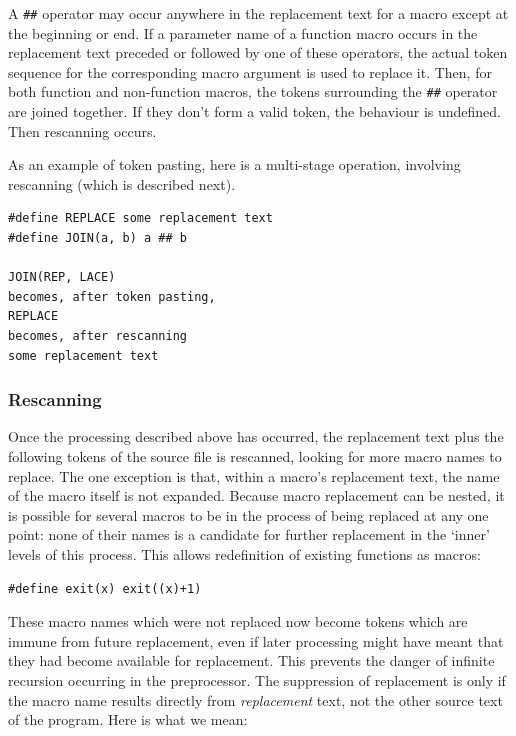     A \texttt{\#\#} operator may occur anywhere in the replacement text
     for a macro except at the beginning or end. If a parameter name of
     a function macro occurs in the replacement text preceded or followed by
     one of these operators, the actual token sequence for the corresponding
     macro argument is used to replace it. Then, for both function and
     non-function macros, the tokens surrounding the \texttt{\#\#}
     operator are joined together. If they don't form a valid token, the
     behaviour is undefined. Then rescanning occurs.


    As an example of token pasting, here is a multi-stage operation,
     involving rescanning (which is described next).


    \begin{Verbatim}
#define REPLACE some replacement text
#define JOIN(a, b) a ## b

JOIN(REP, LACE)
becomes, after token pasting,
REPLACE
becomes, after rescanning
some replacement text
\end{Verbatim}

   

   \subsubsection{Rescanning}
    

    Once the processing described above has occurred, the replacement
     text plus the following tokens of the source file is rescanned, looking
     for more macro names to replace. The one exception is that, within
     a macro's replacement text, the name of the macro itself is not
     expanded. Because macro replacement can be nested, it is possible for
     several macros to be in the process of being replaced at any one point:
     none of their names is a candidate for further replacement in the
     `inner' levels of this process. This allows redefinition of
     existing functions as macros:


    \begin{Verbatim}
#define exit(x) exit((x)+1)
\end{Verbatim}

    These macro names which were not replaced now become tokens which are
     immune from future replacement, even if later processing might have
     meant that they had become available for replacement. This prevents the
     danger of infinite recursion occurring in the preprocessor. The
     suppression of replacement is only if the macro name results directly
     from \textit{replacement} text, not the other source text of the
     program. Here is what we mean:


